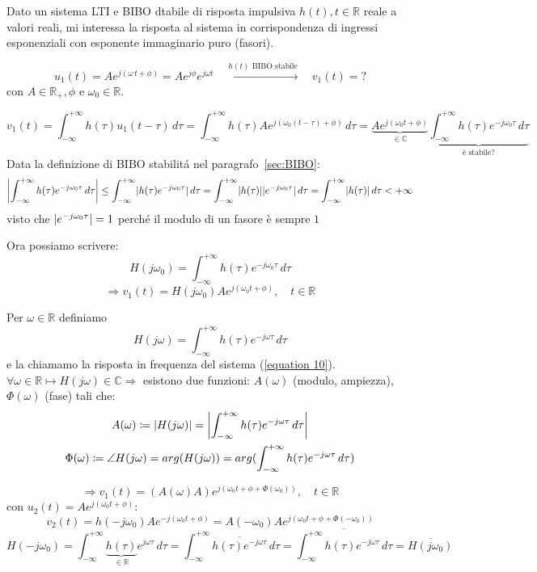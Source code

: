 Dato un sistema LTI e BIBO dtabile di risposta impulsiva $h(t), t \in \mathbb{R}$ reale a valori reali, mi interessa la risposta al sistema in corrispondenza di ingressi esponenziali con esponente immaginario puro (fasori).

\[ 
	 u_1(t) =Ae^{j(\omega \, t + \phi)}= Ae^{j\phi}e^{j\omega t} \quad \overset{h(t)\text{ BIBO stabile}}{\longmapsto} \quad v_1(t)=?
\]
con $A \in \mathbb{R_+}, \phi$ e $\omega_0 \in \mathbb{R}$. %

\[
	v_1(t) = \int_{-\infty}^{+\infty}h(\tau)u_1(t-\tau)\,d\tau
	= \int_{-\infty}^{+\infty}h(\tau)Ae^{j(\omega_0(t-\tau)+\phi)}\,d\tau
	= \underbrace{Ae^{j(\omega_0 t+\phi)}}_{\in \mathbb{C}} \underbrace{\int_{-\infty}^{+\infty}h(\tau)e^{-j\omega_0 \tau}\, d\tau}_{\text{è stabile?}}
\]
Data la definizione di BIBO stabilitá nel paragrafo~\ref{sec:BIBO}:
\[
	\Abs{\int_{-\infty}^{+\infty}h(\tau)e^{-j\omega_0 \tau}\, d\tau} 
	\le \int_{-\infty}^{+\infty}\abs{h(\tau)e^{-j\omega_0 \tau}}\, d\tau
	= \int_{-\infty}^{+\infty}\abs{h(\tau)}\abs{e^{-j\omega_0 \tau}}\, d\tau
	= \int_{-\infty}^{+\infty}\abs{h(\tau)}\, d\tau < +\infty
\]
visto che $\lvert e^{-j\omega_0 \tau}\rvert =1$ perché il modulo di un fasore è sempre $1$

Ora possiamo scrivere:
\[
	H(j\omega_0) = \int_{-\infty}^{+\infty}h(\tau)e^{-j\omega_0 \tau}\, d\tau
\]
\[
	\Rightarrow v_1(t)=H(j\omega_0) A e^{j(\omega_0 t + \phi)}, \quad t \in \mathbb{R}
\]

\begin{definizione}
	Per $ \omega \in \mathbb{R} $ definiamo
	\[
		H(j\omega)= \int_{-\infty}^{+\infty}h(\tau)e^{-j\omega \tau}\, d\tau
	\]
	e la chiamamo la risposta in frequenza del sistema (\ref{equation 10}).
	$ \forall\omega\in\mathbb{R} \mapsto H(j\omega)\in \mathbb{C} \Rightarrow$ esistono due funzioni: $ A(\omega) $ (modulo, ampiezza), $ \Phi(\omega) $ (fase) tali che:
	\begin{gather*}
		A(\omega)\coloneqq\abs{H(j\omega)}=\Abs{\int_{-\infty}^{+\infty}h(\tau)e^{-j\omega \tau}\, d\tau}\\
		\Phi(\omega) \coloneqq \angle H(j\omega)=arg(H(j\omega))=arg(\int_{-\infty}^{+\infty}h(\tau)e^{-j\omega \tau}\, d\tau)
	\end{gather*}
\end{definizione}

\[
	\Rightarrow v_1(t) =(A(\omega)A)e^{j(\omega_0 t+\phi+\Phi(\omega_0))} , \quad t \in \mathbb{R}
\]
con $ u_2(t)= A e^{j(\omega_0 t + \phi)}$:
\[
	v_2(t) =h(-j\omega_0)Ae^{-j(\omega_0 t+\phi)}=A(-\omega_0)Ae^{j(\omega_0 t+\phi+\Phi(-\omega_0))} %
\]
\[
	H(-j\omega_0)= \int_{-\infty}^{+\infty}\underbrace{h(\tau)}_{\in\mathbb{R}}e^{j\omega \tau}\, d\tau
	= \int_{-\infty}^{+\infty}\overline{h(\tau)e^{-j\omega \tau}}\, d\tau
	= \overline{\int_{-\infty}^{+\infty}h(\tau)e^{-j\omega \tau}\, d\tau}
	= \overline{H(j\omega_0)}
\]

